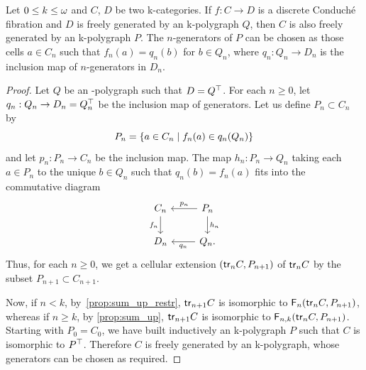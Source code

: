 \begin{theorem}\label{thm:main}
  Let $0 \leq k\leq \omega$ and $C$, $D$ be two \ook k-categories. If $f:C\to
  D$ is a discrete Conduché fibration and $D$ is freely generated by an
  \ook k-polygraph $Q$, then
$C$ is also freely generated by an \ook k-polygraph $P$. The
$n$-generators of $P$ can be chosen as those cells $a\in C_n$ such that
$f_n(a)=q_n(b)$ for $b\in Q_n$, where $q_n:Q_n\to D_n$ is the inclusion map
of $n$-generators in $D_n$.
\end{theorem}
\begin{proof}
  Let $Q$ be an -polygraph such that
  $D=Q^\top$. For each $n\geq 0$, let $q_n:Q_n\to D_n=Q^\top_n$ be the
  inclusion map of generators. Let us define $P_n\subset C_n$ by
  \[
    P_n=\left\{ a\in C_n\; | \; f_n(a)\in q_n (Q_n)\right\}
  \]
  and let $p_n:P_n\to C_n$ be the inclusion map. The map
  $h_n:P_n\to Q_n$ taking each $a\in P_n$ to the unique $b\in Q_n$
  such that $q_n(b)=f_n(a)$ fits into the commutative diagram
  \[
    \begin{tikzcd}
      C_n \ar[d,"f_n"'] & P_n \ar[l,"p_n"'] \ar[d,"h_n"]\\
      D_n & Q_n. \ar[l,"q_n"]
    \end{tikzcd}
\]
  Thus, for each
  $n\geq 0$, we get a cellular extension $(\mathsf{tr}_{n}C,P_{n+1})$ of
  $\mathsf{tr}_{n} C$ by the subset $P_{n+1}\subset C_{n+1}$.

  Now, if $n<k$,
  by~\cref{prop:sum_up_restr}, $\mathsf{tr}_{n+1}C$ is isomorphic to $\mathsf{F}_{n}(\mathsf{tr}_{n}C,P_{n+1})$, whereas if $n\geq k$, by
\cref{prop:sum_up},
  $\mathsf{tr}_{n+1}C$ is isomorphic to $\mathsf{F}_{n,k}(\mathsf{tr}_{n}C,P_{n+1})$. Starting with $P_0=C_0$, we have built
  inductively an \ook k-polygraph
  $P$ such that $C$ is isomorphic to $P^\top$. Therefore $C$ is
  freely generated by an \ook k-polygraph, whose generators can be
  chosen as required.
\end{proof}


